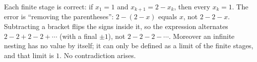 Each finite stage is correct: if $x_1=1$ and $x_{k+1}=2-x_k$, then every $x_k=1$. The error is ``removing the parentheses'': $2-(2-x)$ equals $x$, not $2-2-x$. Subtracting a bracket flips the signs inside it, so the expression alternates $2-2+2-2+\cdots$ (with a final $\pm1$), not $2-2-2-\cdots$. Moreover an infinite nesting has no value by itself; it can only be defined as a limit of the finite stages, and that limit is $1$. No contradiction arises.
